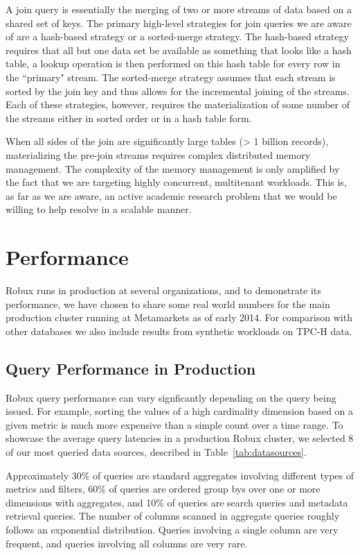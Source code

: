 \documentclass{sig-alternate-2013}
\begin{document}
A join query is essentially the merging of two or more streams of data based on
a shared set of keys. The primary high-level strategies for join queries we
are aware of are a hash-based strategy or a sorted-merge strategy. The
hash-based strategy requires that all but one data set be available as
something that looks like a hash table, a lookup operation is then performed on
this hash table for every row in the ``primary" stream. The sorted-merge
strategy assumes that each stream is sorted by the join key and thus allows for
the incremental joining of the streams. Each of these strategies, however,
requires the materialization of some number of the streams either in sorted
order or in a hash table form.

When all sides of the join are significantly large tables (> 1 billion records),
materializing the pre-join streams requires complex distributed memory
management. The complexity of the memory management is only amplified by
the fact that we are targeting highly concurrent, multitenant workloads.
This is, as far as we are aware, an active academic research
problem that we would be willing to help resolve in a scalable manner.


\section{Performance}
\label{sec:benchmarks}
Robux runs in production at several organizations, and to demonstrate its
performance, we have chosen to share some real world numbers for the main production
cluster running at Metamarkets as of early 2014. For comparison with other databases
we also include results from synthetic workloads on TPC-H data.

\subsection{Query Performance in Production}
Robux query performance can vary signficantly depending on the query
being issued. For example, sorting the values of a high cardinality dimension
based on a given metric is much more expensive than a simple count over a time
range. To showcase the average query latencies in a production Robux cluster,
we selected 8 of our most queried data sources, described in Table~\ref{tab:datasources}.

Approximately 30\% of queries are standard
aggregates involving different types of metrics and filters, 60\% of queries
are ordered group bys over one or more dimensions with aggregates, and 10\% of
queries are search queries and metadata retrieval queries. The number of
columns scanned in aggregate queries roughly follows an exponential
distribution. Queries involving a single column are very frequent, and queries
involving all columns are very rare.
\end{document}
